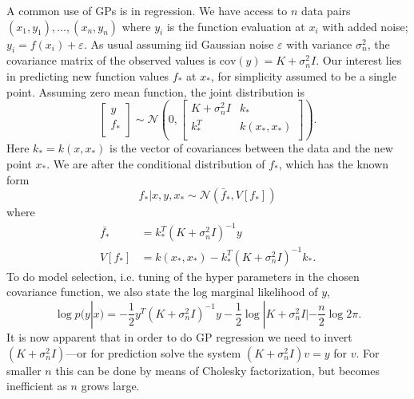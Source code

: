 \documentclass{article}
\theoremstyle{plain}
\theoremstyle{definition}
\theoremstyle{remark}
\begin{document}
A common use of GPs is in regression.
We have access to $n$ data pairs $(x_1, y_1), \hdots, (x_n, y_n)$ where $y_i$ is the function evaluation at $x_i$ with added noise; $y_i = f(x_i) + \varepsilon$.
As usual assuming iid Gaussian noise $\varepsilon$ with variance $\sigma_n^2$, the covariance matrix of the observed values is $\text{cov}(y) = K + \sigma_n^2I$.
Our interest lies in predicting new function values $f_*$ at $x_*$, for simplicity assumed to be a single point.
Assuming zero mean function, the joint distribution is
\begin{equation*}
\begin{bmatrix}
        y \\
        f_* \\
\end{bmatrix} \sim \mathcal{N} \left( 
0,
\begin{bmatrix}
        K + \sigma_n^2I & k_* \\
        k_*^T & k(x_*, x_*) \\
\end{bmatrix}
\right).
\end{equation*}
Here $k_* = k(x, x_*)$ is the vector of covariances between the data and the new point $x_*$.
We are after the conditional distribution of $f_*$, which has the known form
\begin{equation*}
       f_* | x, y, x_* \sim \mathcal{N}(\bar{f}_*, V[f_*])  
\end{equation*}
where 
\begin{align}
        \label{gp_pred}
        \bar{f_*} &= k_*^T (K + \sigma_n^2I)^{-1}y \\
        V[f_*] &= k(x_*, x_*) - k_*^T (K + \sigma_n^2 I)^{-1}k_*.
\end{align}
To do model selection, i.e. tuning of the hyper parameters in the chosen covariance function, we also state the log marginal likelihood of $y$,
\begin{equation}
       \log p(y | x) = -\frac{1}{2}y^T(K + \sigma_n^2I)^{-1}y - \frac{1}{2} \log |K + \sigma_n^2 I| - \frac{n}{2} \log 2\pi. 
\end{equation}
It is now apparent that in order to do GP regression we need to invert $(K + \sigma_n^2I)$—or for prediction solve the system $(K + \sigma_n^2I)v = y$ for $v$. 
For smaller $n$ this can be done by means of Cholesky factorization, but becomes inefficient as $n$ grows large.
\end{document}
